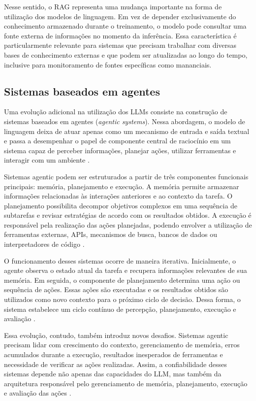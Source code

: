 Nesse sentido, o RAG representa uma mudança importante na forma de utilização dos modelos de linguagem. Em vez de depender exclusivamente do conhecimento armazenado durante o treinamento, o modelo pode consultar uma fonte externa de informações no momento da inferência. Essa característica é particularmente relevante para sistemas que precisam trabalhar com diversas bases de conhecimento externas e que podem ser atualizadas ao longo do tempo, inclusive para monitoramento de fontes específicas como mananciais.

\subsection{Sistemas baseados em agentes}
\label{subsec:agentic}

Uma evolução adicional na utilização dos LLMs consiste na construção de sistemas baseados em agentes (\textit{agentic systems}). Nessa abordagem, o modelo de linguagem deixa de atuar apenas como um mecanismo de entrada e saída textual e passa a desempenhar o papel de componente central de raciocínio em um sistema capaz de perceber informações, planejar ações, utilizar ferramentas e interagir com um ambiente \cite{zhao2026survey}.

Sistemas agentic podem ser estruturados a partir de três componentes funcionais principais: memória, planejamento e execução. A memória permite armazenar informações relacionadas às interações anteriores e ao contexto da tarefa. O planejamento possibilita decompor objetivos complexos em uma sequência de subtarefas e revisar estratégias de acordo com os resultados obtidos. A execução é responsável pela realização das ações planejadas, podendo envolver a utilização de ferramentas externas, APIs, mecanismos de busca, bancos de dados ou interpretadores de código \cite{zhao2026survey}.

O funcionamento desses sistemas ocorre de maneira iterativa. Inicialmente, o agente observa o estado atual da tarefa e recupera informações relevantes de sua memória. Em seguida, o componente de planejamento determina uma ação ou sequência de ações. Essas ações são executadas e os resultados obtidos são utilizados como novo contexto para o próximo ciclo de decisão. Dessa forma, o sistema estabelece um ciclo contínuo de percepção, planejamento, execução e avaliação \cite{zhao2026survey}.

Essa evolução, contudo, também introduz novos desafios. Sistemas agentic precisam lidar com crescimento do contexto, gerenciamento de memória, erros acumulados durante a execução, resultados inesperados de ferramentas e necessidade de verificar as ações realizadas. Assim, a confiabilidade desses sistemas depende não apenas das capacidades do LLM, mas também da arquitetura responsável pelo gerenciamento de memória, planejamento, execução e avaliação das ações \cite{zhao2026survey}.

